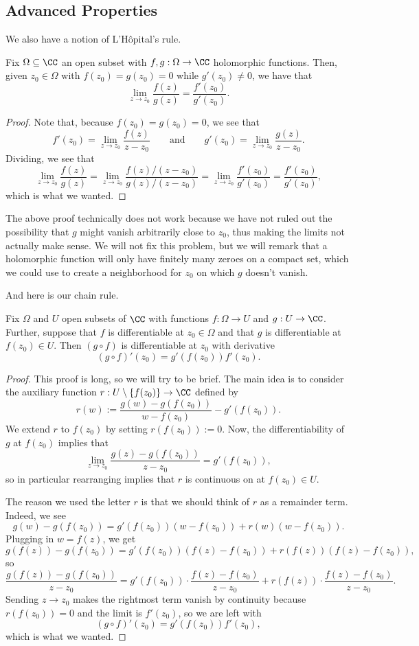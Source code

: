 \subsection{Advanced Properties}
We also have a notion of L'H\^opital's rule.
\begin{proposition}
	Fix $\Omega\subseteq\CC$ an open subset with $f,g:\Omega\to\CC$ holomorphic functions. Then, given $z_0\in\Omega$ with $f(z_0)=g(z_0)=0$ while $g'(z_0)\ne0$, we have that
	\[\lim_{z\to z_0}\frac{f(z)}{g(z)}=\frac{f'(z_0)}{g'(z_0)}.\]
\end{proposition}
\begin{proof}
	Note that, because $f(z_0)=g(z_0)=0$, we see that
	\[f'(z_0)=\lim_{z\to z_0}\frac{f(z)}{z-z_0}\qquad\text{and}\qquad g'(z_0)=\lim_{z\to z_0}\frac{g(z)}{z-z_0}.\]
	Dividing, we see that
	\[\lim_{z\to z_0}\frac{f(z)}{g(z)}=\lim_{z\to z_0}\frac{f(z)/(z-z_0)}{g(z)/(z-z_0)}=\lim_{z\to z_0}\frac{f'(z_0)}{g'(z_0)}=\frac{f'(z_0)}{g'(z_0)},\]
	which is what we wanted.
\end{proof}
\begin{remark}[Nir]
	The above proof technically does not work because we have not ruled out the possibility that $g$ might vanish arbitrarily close to $z_0$, thus making the limits not actually make sense. We will not fix this problem, but we will remark that a holomorphic function will only have finitely many zeroes on a compact set, which we could use to create a neighborhood for $z_0$ on which $g$ doesn't vanish.
\end{remark}
And here is our chain rule.
\begin{proposition}
	Fix $\Omega$ and $U$ open subsets of $\CC$ with functions $f:\Omega\to U$ and $g:U\to\CC$. Further, suppose that $f$ is differentiable at $z_0\in\Omega$ and that $g$ is differentiable at $f(z_0)\in U$. Then $(g\circ f)$ is differentiable at $z_0$ with derivative
	\[(g\circ f)'(z_0)=g'(f(z_0))f'(z_0).\]
\end{proposition}
\begin{proof}
	This proof is long, so we will try to be brief. The main idea is to consider the auxiliary function $r:U\setminus\{f(z_0)\}\to\CC$ defined by
	\[r(w):=\frac{g(w)-g(f(z_0))}{w-f(z_0)}-g'(f(z_0)).\]
	We extend $r$ to $f(z_0)$ by setting $r(f(z_0)):=0$. Now, the differentiability of $g$ at $f(z_0)$ implies that
	\[\lim_{z\to z_0}\frac{g(z)-g(f(z_0))}{z-z_0}=g'(f(z_0)),\]
	so in particular rearranging implies that $r$ is continuous on at $f(z_0)\in U$.

	The reason we used the letter $r$ is that we should think of $r$ as a remainder term. Indeed, we see
	\[g(w)-g(f(z_0))=g'(f(z_0))(w-f(z_0))+r(w)(w-f(z_0)).\]
	Plugging in $w=f(z)$, we get
	\[g(f(z))-g(f(z_0))=g'(f(z_0))(f(z)-f(z_0))+r(f(z))(f(z)-f(z_0)),\]
	so
	\[\frac{g(f(z))-g(f(z_0))}{z-z_0}=g'(f(z_0))\cdot\frac{f(z)-f(z_0)}{z-z_0}+r(f(z))\cdot\frac{f(z)-f(z_0)}{z-z_0}.\]
	Sending $z\to z_0$ makes the rightmost term vanish by continuity because $r(f(z_0))=0$ and the limit is $f'(z_0)$, so we are left with
	\[(g\circ f)'(z_0)=g'(f(z_0))f'(z_0),\]
	which is what we wanted.
\end{proof}
